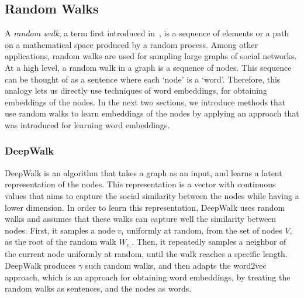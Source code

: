 \subsection{Random Walks}

A \emph{random walk}, a term first introduced in~\cite{pearson1905problem},
is a sequence of elements or a path on a mathematical space
produced by a random process. Among other applications, random walks are used
for sampling large graphs of social networks.
At a high level, a random walk in a graph is a sequence of nodes. This sequence
can be thought of as a sentence where each `node' is a `word'. Therefore, this
analogy lets us directly use techniques of word embeddings, for obtaining
embeddings of the nodes. In the next two sections, we introduce methods that use random walks to learn embeddings of the nodes
by applying an approach that was introduced for learning word embeddings.

\subsubsection{DeepWalk}

DeepWalk is an algorithm that takes a graph as an input, and learns a latent
representation of the nodes. This representation is a vector with continuous
values that aims to capture the social similarity between the nodes while having
a lower dimension. In order to learn this representation, DeepWalk uses random
walks and assumes that these walks can capture well the similarity between
nodes. First, it samples a node $v_i$ uniformly at random, from the set of nodes
$V$, as the root of the random walk $W_{v_i}$. Then, it repeatedly samples
a neighbor of the current node uniformly at random, until the walk reaches a
specific length. DeepWalk produces $\gamma$ such random
walks, and then adapts the word2vec approach, which is an approach for obtaining
word embeddings, by treating the random walks as sentences, and the nodes as
words.

